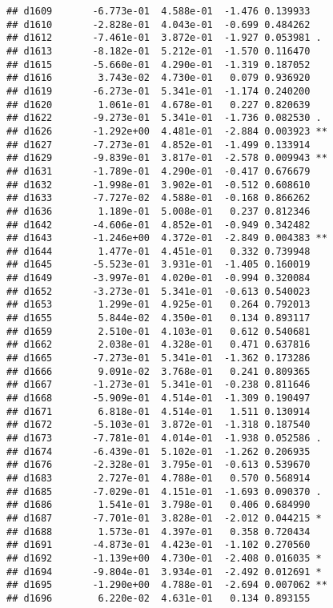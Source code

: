 \documentclass[
]{article}
\begin{document}
\begin{verbatim}
## d1609       -6.773e-01  4.588e-01  -1.476 0.139933    
## d1610       -2.828e-01  4.043e-01  -0.699 0.484262    
## d1612       -7.461e-01  3.872e-01  -1.927 0.053981 .  
## d1613       -8.182e-01  5.212e-01  -1.570 0.116470    
## d1615       -5.660e-01  4.290e-01  -1.319 0.187052    
## d1616        3.743e-02  4.730e-01   0.079 0.936920    
## d1619       -6.273e-01  5.341e-01  -1.174 0.240200    
## d1620        1.061e-01  4.678e-01   0.227 0.820639    
## d1622       -9.273e-01  5.341e-01  -1.736 0.082530 .  
## d1626       -1.292e+00  4.481e-01  -2.884 0.003923 ** 
## d1627       -7.273e-01  4.852e-01  -1.499 0.133914    
## d1629       -9.839e-01  3.817e-01  -2.578 0.009943 ** 
## d1631       -1.789e-01  4.290e-01  -0.417 0.676679    
## d1632       -1.998e-01  3.902e-01  -0.512 0.608610    
## d1633       -7.727e-02  4.588e-01  -0.168 0.866262    
## d1636        1.189e-01  5.008e-01   0.237 0.812346    
## d1642       -4.606e-01  4.852e-01  -0.949 0.342482    
## d1643       -1.246e+00  4.372e-01  -2.849 0.004383 ** 
## d1644        1.477e-01  4.451e-01   0.332 0.739948    
## d1645       -5.523e-01  3.931e-01  -1.405 0.160019    
## d1649       -3.997e-01  4.020e-01  -0.994 0.320084    
## d1652       -3.273e-01  5.341e-01  -0.613 0.540023    
## d1653        1.299e-01  4.925e-01   0.264 0.792013    
## d1655        5.844e-02  4.350e-01   0.134 0.893117    
## d1659        2.510e-01  4.103e-01   0.612 0.540681    
## d1662        2.038e-01  4.328e-01   0.471 0.637816    
## d1665       -7.273e-01  5.341e-01  -1.362 0.173286    
## d1666        9.091e-02  3.768e-01   0.241 0.809365    
## d1667       -1.273e-01  5.341e-01  -0.238 0.811646    
## d1668       -5.909e-01  4.514e-01  -1.309 0.190497    
## d1671        6.818e-01  4.514e-01   1.511 0.130914    
## d1672       -5.103e-01  3.872e-01  -1.318 0.187540    
## d1673       -7.781e-01  4.014e-01  -1.938 0.052586 .  
## d1674       -6.439e-01  5.102e-01  -1.262 0.206935    
## d1676       -2.328e-01  3.795e-01  -0.613 0.539670    
## d1683        2.727e-01  4.788e-01   0.570 0.568914    
## d1685       -7.029e-01  4.151e-01  -1.693 0.090370 .  
## d1686        1.541e-01  3.798e-01   0.406 0.684990    
## d1687       -7.701e-01  3.828e-01  -2.012 0.044215 *  
## d1688        1.573e-01  4.397e-01   0.358 0.720434    
## d1691       -4.873e-01  4.423e-01  -1.102 0.270560    
## d1692       -1.139e+00  4.730e-01  -2.408 0.016035 *  
## d1694       -9.804e-01  3.934e-01  -2.492 0.012691 *  
## d1695       -1.290e+00  4.788e-01  -2.694 0.007062 ** 
## d1696        6.220e-02  4.631e-01   0.134 0.893155    

\end{verbatim}
\end{document}
